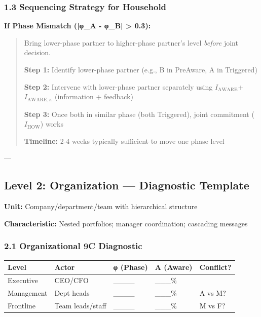 \subsubsection*{1.3 Sequencing Strategy for Household}

\textbf{If Phase Mismatch (|φ\_A - φ\_B| > 0.3):}

\begin{quote}
Bring lower-phase partner to higher-phase partner's level \emph{before} joint decision.

\textbf{Step 1:} Identify lower-phase partner (e.g., B in PreAware, A in Triggered)

\textbf{Step 2:} Intervene with lower-phase partner separately using $I_{\text{AWARE}}$+$I_{\text{AWARE},\kappa}$ (information + feedback)

\textbf{Step 3:} Once both in similar phase (both Triggered), joint commitment ($I_{\text{HOW}}$) works

\textbf{Timeline:} 2-4 weeks typically sufficient to move one phase level
\end{quote}

---


\subsection*{Level 2: Organization --- Diagnostic Template}

\textbf{Unit:} Company/department/team with hierarchical structure

\textbf{Characteristic:} Nested portfolios; manager coordination; cascading messages

\subsubsection*{2.1 Organizational 9C Diagnostic}

\begin{center}
\small
\begin{tabular}{@{}lllll@{}}
\toprule
\textbf{Level} & \textbf{Actor} & \textbf{φ (Phase)} & \textbf{A (Aware)} & \textbf{Conflict?} \\
\midrule
Executive & CEO/CFO & \_\_\_\_ & \_\_\_\% & \\
Management & Dept heads & \_\_\_\_ & \_\_\_\% & A vs M? \\
Frontline & Team leads/staff & \_\_\_\_ & \_\_\_\% & M vs F? \\
\midrule
\end{tabular}
\end{center}

